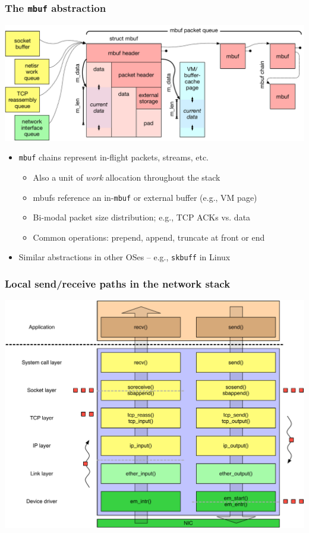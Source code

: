 \begin{frame}
  \frametitle{The \texttt{mbuf} abstraction}

  \begin{center}
    \includegraphics[width=\textwidth]{../../figures/network-mbufs.pdf}
  \end{center}

  \begin{itemize}
    \item \texttt{mbuf} chains represent in-flight packets, streams, etc.
    \begin{itemize}
      \item Also a unit of \textit{work} allocation throughout the stack
      \item mbufs reference an in-\texttt{mbuf} or external buffer (e.g., VM
      page)
      \item Bi-modal packet size distribution; e.g., TCP ACKs vs. data
      \item Common operations: prepend, append, truncate at front or end
    \end{itemize}
    \item Similar abstractions in other OSes -- e.g., \texttt{skbuff} in Linux
  \end{itemize}
\end{frame}

\begin{frame}
  \frametitle{Local send/receive paths in the network stack}
  \begin{center}
    \includegraphics[scale=0.4]{../../figures/network-in-out.pdf}
  \end{center}
\end{frame}

